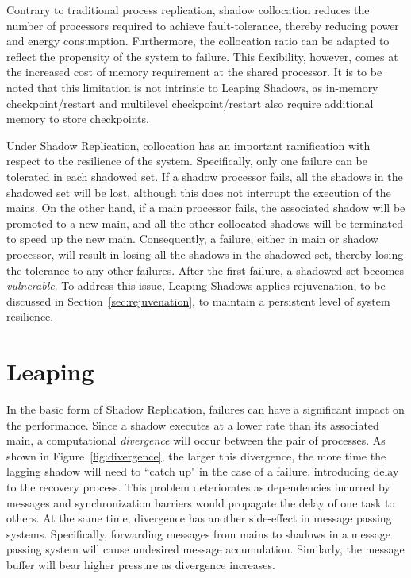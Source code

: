 Contrary to traditional process replication, shadow collocation reduces
the number of processors required to achieve fault-tolerance,
thereby reducing power and energy consumption. Furthermore, the collocation ratio can be adapted to reflect the
propensity of the system to failure. This flexibility, however,
comes at the increased cost of memory requirement at the
shared processor. It is to be noted that this limitation is not
intrinsic to Leaping Shadows, as in-memory checkpoint/restart and multilevel checkpoint/restart also require additional memory to store checkpoints.

Under Shadow Replication, collocation has an important ramification with respect to the resilience of the system. Specifically, only
one failure can be tolerated in each shadowed set. If a shadow processor fails, all the shadows in the 
shadowed set will be lost, although this does not interrupt the execution of the mains. 
On the other hand, if a main processor fails, the associated shadow will be promoted to a new main, and all 
the other collocated shadows will be terminated to speed up the new main.
Consequently, a failure, either in main or shadow processor, will result in losing all the shadows in the shadowed set, thereby losing the tolerance to any other failures. After the first failure, a shadowed set becomes \emph{vulnerable}. To address this issue, Leaping Shadows applies rejuvenation, to be discussed in Section~\ref{sec:rejuvenation}, to maintain a persistent level of system resilience.



\section{Leaping}
\label{sec:leaping_shadows}

In the basic form of Shadow Replication, failures can
have a significant impact on the performance. Since a
shadow executes at a lower rate than its associated main,
a computational \textit{divergence} will occur between the pair of processes. As shown in Figure~\ref{fig:divergence}, the larger this divergence, the more time the lagging shadow will need to ``catch up" in the case of a failure, introducing delay to the recovery process. 
This problem deteriorates as dependencies incurred by messages and synchronization barriers would propagate the delay of one task to others. 
At the same time, divergence has another side-effect in message passing systems. Specifically, forwarding messages from mains to shadows in a message passing system will cause undesired message accumulation. Similarly, the message buffer will bear higher pressure as divergence increases. 

